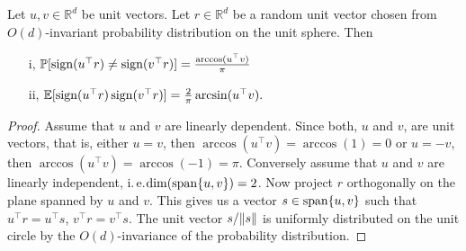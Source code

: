 \begin{lemma}
	Let $u,v\in\mathbb{R}^d$ be unit vectors. Let $r\in\mathbb{R}^d$ be a random unit vector chosen from $O(d)$-invariant probability distribution on the unit sphere. Then
	\begin{enumerate}
		\item[i,] $\mathbb{P}[\operatorname{sign}(u^\top r)\neq\operatorname{sign}(v^\top r)]=\frac{\arccos(u^\top v)}{\pi}$
		\item[ii,] $\mathbb{E}[\operatorname{sign}(u^\top r)\operatorname{sign}(v^\top r)]=\frac{2}{\pi}\arcsin(u^\top v).$
	\end{enumerate}
\end{lemma}
\begin{proof}
	Assume that $u$ and $v$ are linearly dependent. Since both, $u$ and $v$, are unit vectors, that is, either $u=v$, then $\arccos(u^\top v) = \arccos(1)=0$ or $u=-v$, then $\arccos(u^\top v) = \arccos(-1) = \pi$.
	Conversely assume that $u$ and $v$ are linearly independent, i.\,e.$ \operatorname{dim}(\operatorname{span}\{u,v\})=2$. Now project $r$ orthogonally on the plane spanned by $u$ and $v$. This gives us a vector $s\in \operatorname{span}\{u,v\}$ such that $u^\top r = u^\top s$, $v^\top r = v^\top s$. The unit vector $s/ \Vert {s} \Vert$ is uniformly distributed on the unit circle by the $O(d)$-invariance of the probability distribution. 
\end{proof}
